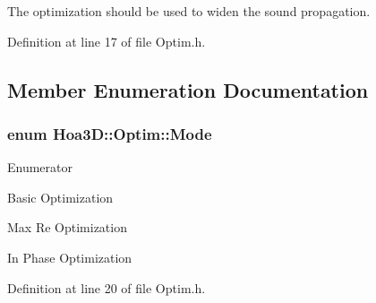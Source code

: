 The optimization should be used to widen the sound propagation. 

Definition at line 17 of file Optim.\-h.



\subsection{Member Enumeration Documentation}
\hypertarget{class_hoa3_d_1_1_optim_a1a153ac21e7a112279824f17981cf147}{
\subsubsection[{Mode}]{\setlength{\rightskip}{0pt plus 5cm}enum {\bf Hoa3\-D\-::\-Optim\-::\-Mode}}}\label{class_hoa3_d_1_1_optim_a1a153ac21e7a112279824f17981cf147}
\begin{Desc}
\item[Enumerator]\par
\begin{description}
\item[{\em 
\hypertarget{class_hoa3_d_1_1_optim_a1a153ac21e7a112279824f17981cf147a89acb58975922396713cc88cafc55b45}{Basic}\label{class_hoa3_d_1_1_optim_a1a153ac21e7a112279824f17981cf147a89acb58975922396713cc88cafc55b45}
}]Basic Optimization \item[{\em 
\hypertarget{class_hoa3_d_1_1_optim_a1a153ac21e7a112279824f17981cf147a491a405ba48de3977668d54a8d9ff44a}{Max\-Re}\label{class_hoa3_d_1_1_optim_a1a153ac21e7a112279824f17981cf147a491a405ba48de3977668d54a8d9ff44a}
}]Max Re Optimization \item[{\em 
\hypertarget{class_hoa3_d_1_1_optim_a1a153ac21e7a112279824f17981cf147aa0c4f4688d5dbfa59b1774d7b2082105}{in\-Phase}\label{class_hoa3_d_1_1_optim_a1a153ac21e7a112279824f17981cf147aa0c4f4688d5dbfa59b1774d7b2082105}
}]In Phase Optimization \end{description}
\end{Desc}


Definition at line 20 of file Optim.\-h.



